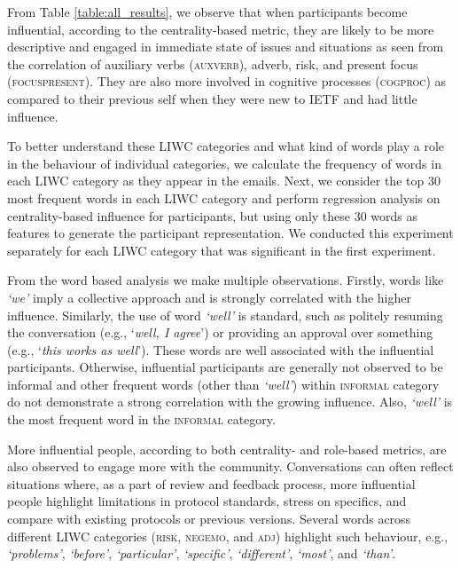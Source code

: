 \documentclass[twocolumn,10pt]{article}
\newcommand{\pb}[1]{\vspace{0.75ex}\noindent{\textbf{#1}}}
\newcommand{\liwc}[1]{\textsc{#1}}
\newcommand{\word}[1]{\textit{`#1'}}
\begin{document}
From Table \ref{table:all_results}, we observe that when participants
become influential, according to the centrality-based metric, they are
likely to be more descriptive and engaged in immediate state of issues
and situations as seen from the correlation of auxiliary verbs
(\liwc{auxverb}), adverb, risk, and present focus (\liwc{focuspresent}).
They are also more involved in cognitive processes (\liwc{cogproc}) as
compared to their previous self when they were new to IETF and had little
influence. 

\pb{What Kinds of Language are Used?}
To better understand these LIWC categories and what kind of words play a
role in the behaviour of individual categories, we calculate the frequency
of words in each LIWC category as they appear in the emails. 
Next, we consider the top 30 most frequent words in each LIWC category and
perform regression analysis on centrality-based influence for participants,
but using only these 30 words as features to generate the participant
representation. We conducted this experiment separately for each LIWC
category that was significant in the first experiment.

From the word based analysis we make multiple observations. Firstly, words
like \word{we} imply a collective approach and is strongly correlated with
the higher influence. 
Similarly, the use of word \word{well} is standard, such as politely
resuming the conversation (e.g., `\textit{well, I agree}') or providing an
approval over something (e.g., `\textit{this works as well}'). These words
are well associated with the influential participants.  Otherwise,
influential participants are generally not observed to be informal and
other frequent words (other than \word{well}) within \liwc{informal}
category do not demonstrate a strong correlation with the growing
influence. Also, \word{well} is the most frequent word in the
\liwc{informal} category.

More influential people, according to both centrality- and role-based
metrics, are also observed to engage more with the community.
Conversations can often reflect situations where, as a part of review and
feedback process, more influential people highlight limitations in protocol
standards, stress on specifics, and compare with existing protocols or
previous versions.
Several words across different LIWC categories (\liwc{risk}, \liwc{negemo},
and \liwc{adj}) highlight such behaviour, e.g., \word{problems}, \word{before},
\word{particular}, \word{specific}, \word{different}, \word{most}, and \word{than}.
\end{document}
